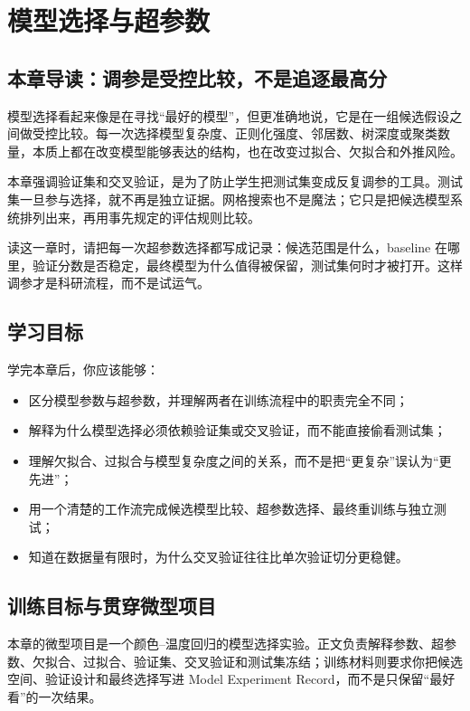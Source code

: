 \chapter{模型选择与超参数}

\section{本章导读：调参是受控比较，不是追逐最高分}

模型选择看起来像是在寻找“最好的模型”，但更准确地说，它是在一组候选假设之间做受控比较。每一次选择模型复杂度、正则化强度、邻居数、树深度或聚类数量，本质上都在改变模型能够表达的结构，也在改变过拟合、欠拟合和外推风险。

本章强调验证集和交叉验证，是为了防止学生把测试集变成反复调参的工具。测试集一旦参与选择，就不再是独立证据。网格搜索也不是魔法；它只是把候选模型系统排列出来，再用事先规定的评估规则比较。

读这一章时，请把每一次超参数选择都写成记录：候选范围是什么，baseline 在哪里，验证分数是否稳定，最终模型为什么值得被保留，测试集何时才被打开。这样调参才是科研流程，而不是试运气。

\section{学习目标}

学完本章后，你应该能够：

\begin{itemize}
    \item 区分模型参数与超参数，并理解两者在训练流程中的职责完全不同；
    \item 解释为什么模型选择必须依赖验证集或交叉验证，而不能直接偷看测试集；
    \item 理解欠拟合、过拟合与模型复杂度之间的关系，而不是把“更复杂”误认为“更先进”；
    \item 用一个清楚的工作流完成候选模型比较、超参数选择、最终重训练与独立测试；
    \item 知道在数据量有限时，为什么交叉验证往往比单次验证切分更稳健。
\end{itemize}

\section{训练目标与贯穿微型项目}

本章的微型项目是一个颜色--温度回归的模型选择实验。正文负责解释参数、超参数、欠拟合、过拟合、验证集、交叉验证和测试集冻结；训练材料则要求你把候选空间、验证设计和最终选择写进 Model Experiment Record，而不是只保留“最好看”的一次结果。

